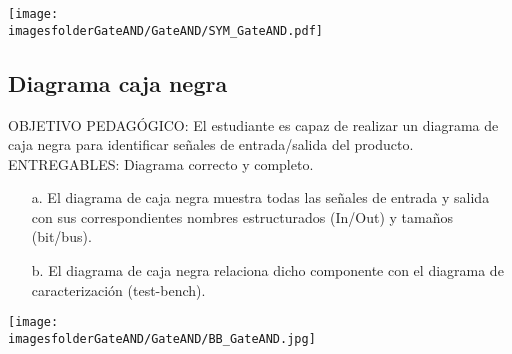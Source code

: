 		\begin{center}
			\texttt{[image: \\imagesfolderGateAND/GateAND/SYM\_GateAND.pdf]}%
		\end{center}
\subsection{Diagrama caja negra}
\scriptsize
		\begin{tcolorbox}[enhanced,title=PRODUCTO DE CALIDAD:,colframe=colorA1,colback=colorA2,arc=0mm,colbacktitle=white,fonttitle=\bfseries,coltitle=white,attach boxed title to top left={xshift=3.2mm,yshift=-0.50mm},boxed title style={skin=enhancedfirst jigsaw,size=small,arc=0mm,bottom=1mm,interior style={fill=none,top color=color2,bottom color=color2},,boxrule=0pt},boxrule=0pt]
		OBJETIVO PEDAGÓGICO: El estudiante es capaz de realizar un diagrama de caja negra para identificar señales de entrada/salida del producto.\\
		ENTREGABLES: Diagrama correcto y completo.
		\begin{enumerate}
			\item[a.] El diagrama de caja negra muestra todas las señales de entrada y salida con sus correspondientes nombres estructurados (In/Out) y tamaños (bit/bus).
			\item[b.] El diagrama de caja negra relaciona dicho componente con el diagrama de caracterización (test-bench).
		\end{enumerate}
	\end{tcolorbox}

\normalsize


		\begin{center}
			\texttt{[image: \\imagesfolderGateAND/GateAND/BB\_GateAND.jpg]}%
		\end{center}
